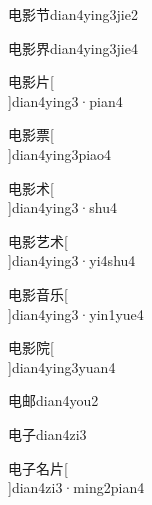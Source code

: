 \begin{verbete}[5;15;5]{电影节}{dian4ying3jie2}
\end{verbete}

\begin{verbete}[5;15;9]{电影界}{dian4ying3jie4}
\end{verbete}

\begin{verbete}[5;15;4]{电影片}[\\]{dian4ying3·pian4}
\end{verbete}

\begin{verbete}[5;15;11]{电影票}[\\]{dian4ying3piao4}
\end{verbete}

\begin{verbete}[5;15;5]{电影术}[\\]{dian4ying3·shu4}
\end{verbete}

\begin{verbete}[5;15;4;5]{电影艺术}[\\]{dian4ying3·yi4shu4}
\end{verbete}

\begin{verbete}[5;15;9;5]{电影音乐}[\\]{dian4ying3·yin1yue4}
\end{verbete}

\begin{verbete}[5;15;9]{电影院}[\\]{dian4ying3yuan4}
\end{verbete}

\begin{verbete}[5;7]{电邮}{dian4you2}
\end{verbete}

\begin{verbete}[5;3]{电子}{dian4zi3}
\end{verbete}

\begin{verbete}[5;3;6;4]{电子名片}[\\]{dian4zi3·ming2pian4}
\end{verbete}

